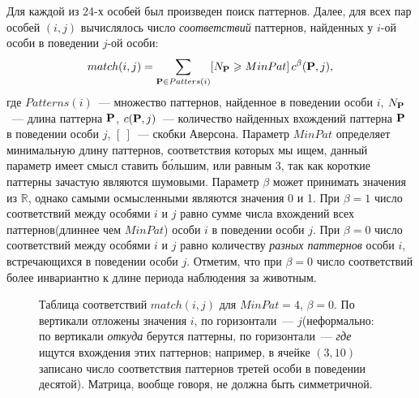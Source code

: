 \documentclass[12pt,fсeqn]{article}
\begin{document}
Для каждой из 24-х особей был произведен поиск паттернов. Далее, для всех пар 
особей $(i,j)$ вычислялось число {\em соответствий}  паттернов, найденных 
у $i$-ой особи в поведении $j$-ой особи:
$$
match(i,j) = \sum_{{\bf P}\in Patters(i)}[ N_{{\bf P}} \geqslant MinPat ]\, c^\beta({\bf P}, j),
$$
где $Patterns(i)$~--- множество паттернов, найденное в поведении особи $i$, 
$N_{{\bf P}}$~--- длина паттерна ${\bf P}$,
$c({\bf P}, j)$~--- количество найденных вхождений паттерна ${\bf P}$ в поведении
особи $j$, $[~]$~--- скобки Аверсона. Параметр $MinPat$ определяет минимальную длину паттернов, соответствия которых мы ищем, 
данный параметр имеет смысл ставить б\'{о}льшим, или равным 3, так как короткие паттерны
зачастую являются шумовыми. Параметр $\beta$ может принимать значения из $\mathbb{R}$,
однако самыми осмысленными являются значения 0 и 1. При $\beta=1$ число соответствий
между особями $i$ и $j$ равно сумме числа вхождений всех паттернов(длиннее чем $MinPat$) 
особи $i$ в поведении особи $j$. При $\beta=0$ число соответствий
между особями $i$ и $j$ равно количеству {\em разных паттернов} особи $i$, встречающихся
в поведении особи $j$. Отметим, что при $\beta=0$ число соответствий более инвариантно
к длине периода наблюдения за животным.
\begin{figure}[H]
\noindent{}
\caption{ Таблица соответствий $match(i,j)$ для $MinPat=4$, $\beta=0$. По вертикали отложены значения $i$, по горизонтали~--- $j$(неформально: 
по вертикали {\em откуда} берутся паттерны, по горизонтали~--- {\em где} ищутся вхождения этих паттернов; например, в ячейке $(3,10)$ записано
число соответствия паттернов третей особи в поведении десятой). Матрица, вообще говоря, не должна быть 
симметричной.}
\label{fig:cross}
\end{figure}
\end{document}
